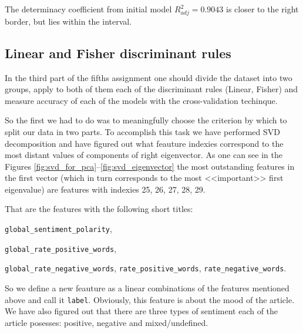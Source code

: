 The determinacy coefficient from initial model $R^2_{adj} = 0.9043$ is closer to the right border, but lies within the interval. 


\subsection{Linear and Fisher discriminant rules}
In the third part of the fifths assignment one should divide the dataset into two groups, apply to both of them each of the discriminant rules (Linear, Fisher) and measure  accuracy of each of the models with the cross-validation techinque.

So the first we had to do was to meaningfully choose the criterion by which to split our data in two parts. 
To accomplish this task we have performed SVD decomposition and have figured out what feauture indexies  correspond to the most distant values of components of right eigenvector. As one can see in the Figures \ref{fig:svd_for_pca}--\ref{fig:svd_eigenvector} the most outstanding features in the first vector (which in turn corresponds to the most <<important>> first eigenvalue) are features with indexies 25, 26, 27, 28, 29. 

That are the features with the following short titles: 

 \texttt{global\_sentiment\_polarity},
 
 
 \texttt{global\_rate\_positive\_words},
 
 
 \texttt{global\_rate\_negative\_words},
  \texttt{rate\_positive\_words},
   \texttt{rate\_negative\_words}.    

So we define a new feauture as a linear combinations of the features mentioned above and call it \texttt{label}. Obviously, this feature is about the mood of the article. We have also figured out that there are three types of sentiment each of the article posesses: positive, negative and mixed/undefined.




